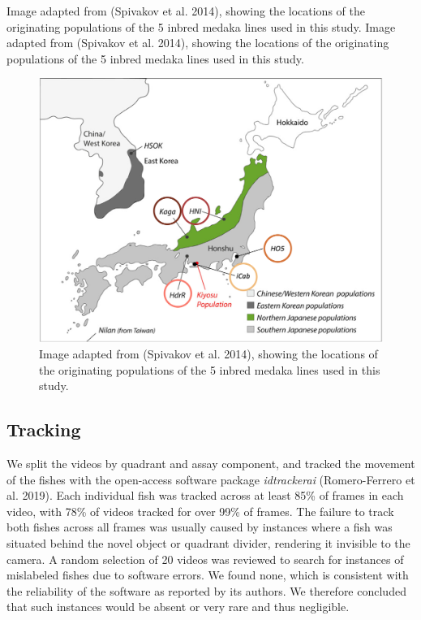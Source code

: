 \documentclass[
]{book}
\begin{document}
Image adapted from (Spivakov et al. 2014), showing the locations of the originating populations of the 5 inbred medaka lines used in this study. Image adapted from (Spivakov et al. 2014), showing the locations of the originating populations of the 5 inbred medaka lines used in this study.

\begin{figure}
\includegraphics[width=1\linewidth]{figs/pilot/line_locations} \caption{Image adapted from (Spivakov et al. 2014), showing the locations of the originating populations of the 5 inbred medaka lines used in this study.}\label{fig:line-locations}
\end{figure}

\hypertarget{tracking}{%
\subsection{Tracking}\label{tracking}}

We split the videos by quadrant and assay component, and tracked the movement of the fishes with the open-access software package \emph{idtrackerai} (Romero-Ferrero et al. 2019). Each individual fish was tracked across at least 85\% of frames in each video, with 78\% of videos tracked for over 99\% of frames. The failure to track both fishes across all frames was usually caused by instances where a fish was situated behind the novel object or quadrant divider, rendering it invisible to the camera. A random selection of 20 videos was reviewed to search for instances of mislabeled fishes due to software errors. We found none, which is consistent with the reliability of the software as reported by its authors. We therefore concluded that such instances would be absent or very rare and thus negligible.
\end{document}
